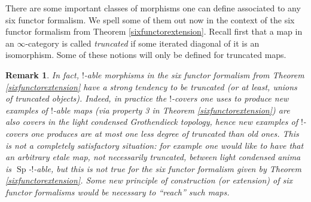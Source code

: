\documentclass[12pt]{article}
\newtheorem{remark}[theorem]{Remark}
\newcommand{\on}{\operatorname}
\begin{document}
There are some important classes of morphisms one can define associated to any six functor formalism.  We spell some of them out now in the context of the six functor formalism from Theorem \ref{sixfunctorextension}.  Recall first that a map in an $\infty$-category is called \emph{truncated} if some iterated diagonal of it is an isomorphism.  Some of these notions will only be defined for truncated maps.

\begin{remark}
In fact, $!$-able morphisms in the six functor formalism from Theorem \ref{sixfunctorextension} have a strong tendency to be truncated (or at least, unions of truncated objects).  Indeed, in practice the $!$-covers one uses to produce new examples of $!$-able maps (via property 3 in Theorem \ref{sixfunctorextension}) are also covers in the light condensed Grothendieck topology, hence new examples of $!$-covers one produces are at most one less degree of truncated than old ones.  This is not a completely satisfactory situation: for example one would like to have that an arbitrary etale map, not necessarily truncated, between light condensed anima is $\on{Sp}$-$!$-able, but this is not true for the six functor formalism given by Theorem \ref{sixfunctorextension}.  Some new principle of construction (or extension) of six functor formalisms would be necessary to ``reach'' such maps.
\end{remark}
\end{document}
